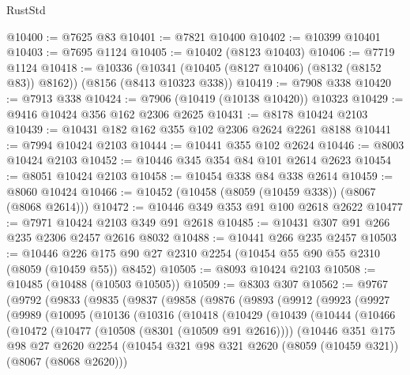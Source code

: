 \begin{lexlean}{RustStd}
\begin{coremodule}
{\begin{coremodule}
{{{{{{{{{{{{{{{{{{{{{{{{{{{{{{{{{{@10400 := @7625 @83
@10401 := @7821 @10400
@10402 := @10399 @10401
@10403 := @7695 @1124
@10405 := @10402 (@8123 @10403)
@10406 := @7719 @1124
@10418 := @10336
    (@10341 (@10405 (@8127 @10406) (@8132 (@8152 @83)) @8162))
    (@8156 (@8413 @10323 @338))
@10419 := @7908 @338
@10420 := @7913 @338
@10424 := @7906 (@10419 (@10138 @10420)) @10323
@10429 := @9416 @10424 @356 @162 @2306 @2625
@10431 := @8178 @10424 @2103
@10439 := @10431 @182 @162 @355 @102 @2306 @2624 @2261 @8188
@10441 := @7994 @10424 @2103
@10444 := @10441 @355 @102 @2624
@10446 := @8003 @10424 @2103
@10452 := @10446 @345 @354 @84 @101 @2614 @2623
@10454 := @8051 @10424 @2103
@10458 := @10454 @338 @84 @338 @2614
@10459 := @8060 @10424
@10466 := @10452 (@10458 (@8059 (@10459 @338)) (@8067 (@8068 @2614)))
@10472 := @10446 @349 @353 @91 @100 @2618 @2622
@10477 := @7971 @10424 @2103 @349 @91 @2618
@10485 := @10431 @307 @91 @266 @235 @2306 @2457 @2616 @8032
@10488 := @10441 @266 @235 @2457
@10503 := @10446 @226 @175 @90 @27 @2310 @2254 (@10454 @55 @90 @55 @2310 (@8059 (@10459 @55)) @8452)
@10505 := @8093 @10424 @2103
@10508 := @10485 (@10488 (@10503 @10505))
@10509 := @8303 @307
@10562 := @9767
    (@9792
      (@9833
        (@9835
          (@9837
            (@9858
              (@9876
                (@9893
                  (@9912
                    (@9923
                      (@9927
                        (@9989
                          (@10095
                            (@10136
                              (@10316
                                (@10418
                                  (@10429
                                    (@10439
                                      (@10444
                                        (@10466
                                          (@10472
                                            (@10477 (@10508 (@8301 (@10509 @91 @2616))))
                                            (@10446
                                              @351
                                              @175
                                              @98
                                              @27
                                              @2620
                                              @2254
                                              (@10454
                                                @321
                                                @98
                                                @321
                                                @2620
                                                (@8059 (@10459 @321))
                                                (@8067 (@8068 @2620)))
}}}}}}}}}}}}}}}}}}}}}}}}}}}}}}}}}}
\end{coremodule}}
\end{coremodule}
\end{lexlean}

